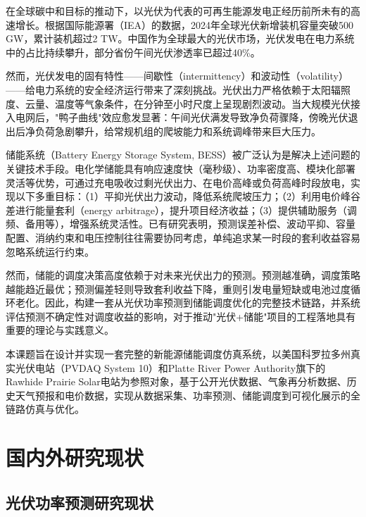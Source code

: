 \documentclass[12pt,a4paper]{ctexbook}
\begin{document}
在全球碳中和目标的推动下，以光伏为代表的可再生能源发电正经历前所未有的高速增长。根据国际能源署（IEA）的数据，2024年全球光伏新增装机容量突破500 GW，累计装机超过2 TW\cite{iea-pvps-2025}。中国作为全球最大的光伏市场，光伏发电在电力系统中的占比持续攀升，部分省份午间光伏渗透率已超过40\%。\cite{iea-pvps-2025,cn-storage-config-review-2025}

然而，光伏发电的固有特性——间歇性（intermittency）和波动性（volatility）——给电力系统的安全经济运行带来了深刻挑战。光伏出力严格依赖于太阳辐照度、云量、温度等气象条件，在分钟至小时尺度上呈现剧烈波动。当大规模光伏接入电网后，"鸭子曲线"效应愈发显著：午间光伏满发导致净负荷骤降，傍晚光伏退出后净负荷急剧攀升，给常规机组的爬坡能力和系统调峰带来巨大压力\cite{duck-curve-caiso-2016}。

储能系统（Battery Energy Storage System, BESS）被广泛认为是解决上述问题的关键技术手段\cite{bess-review-2023,cn-storage-config-review-2025}。电化学储能具有响应速度快（毫秒级）、功率密度高、模块化部署灵活等优势，可通过充电吸收过剩光伏出力、在电价高峰或负荷高峰时段放电，实现以下多重目标：（1）平抑光伏出力波动，降低系统爬坡压力；（2）利用电价峰谷差进行能量套利（energy arbitrage），提升项目经济收益；（3）提供辅助服务（调频、备用等），增强系统灵活性。已有研究表明，预测误差补偿、波动平抑、容量配置、消纳约束和电压控制往往需要协同考虑，单纯追求某一时段的套利收益容易忽略系统运行约束\cite{xie-hybrid-storage-2021}。

然而，储能的调度决策高度依赖于对未来光伏出力的预测。预测越准确，调度策略越能趋近最优；预测偏差轻则导致套利收益下降，重则引发电量短缺或电池过度循环老化。因此，构建一套从光伏功率预测到储能调度优化的完整技术链路，并系统评估预测不确定性对调度收益的影响，对于推动"光伏+储能"项目的工程落地具有重要的理论与实践意义。\cite{xie-hybrid-storage-2021,milp-dispatch-2021,drl-energy-storage-2023,battery-degradation-review-2021}

本课题旨在设计并实现一套完整的新能源储能调度仿真系统，以美国科罗拉多州真实光伏电站（PVDAQ System 10）和Platte River Power Authority旗下的Rawhide Prairie Solar电站为参照对象，基于公开光伏数据、气象再分析数据、历史天气预报和电价数据，实现从数据采集、功率预测、储能调度到可视化展示的全链路仿真与优化\cite{pvdaq-nrel,rawhide-nrel}。\cite{pvdaq-nrel,nsrdb-nrel,opsd-datapackage-2020,opsd-wiese-2019,open-meteo-2023,rawhide-nrel}

\section{国内外研究现状}

\subsection{光伏功率预测研究现状}
\end{document}
